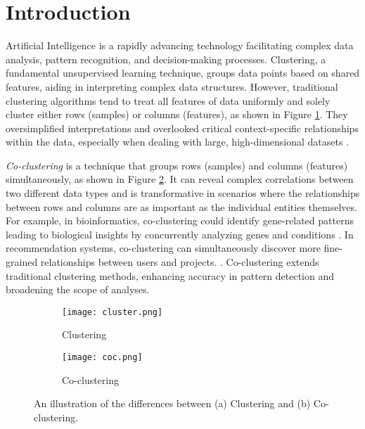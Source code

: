 

\section{Introduction}
Artificial Intelligence is a rapidly advancing technology facilitating complex data analysis, pattern recognition, and decision-making processes. Clustering, a fundamental unsupervised learning technique, groups data points based on shared features, aiding in interpreting complex data structures. However, traditional clustering algorithms \cite{zhang2023AdaptiveGraphConvolution, yuan2023JointNetworkTopology, wu2023EffectiveClusteringStructured}  tend to treat all features of data uniformly and solely cluster either rows (samples) or columns (features),  as shown in Figure \ref{fig:cluster}. They oversimplified interpretations and overlooked critical context-specific relationships within the data, especially when dealing with large, high-dimensional datasets \cite{chen2023FastFlexibleBipartite, zhao2023MultiviewCoclusteringMultisimilarity, kumar2023CoclusteringBasedMethods}.

\textit{Co-clustering}\cite{cheng2000BiclusteringExpressionData, kluger2003SpectralBiclusteringMicroarray, yan2017CoclusteringMultidimensionalBig} is a technique that groups rows (samples) and columns (features) simultaneously, as shown in Figure \ref{fig:cocluster}. It can reveal complex correlations between two different data types and is transformative in scenarios where the relationships between rows and columns are as important as the individual entities themselves. For example, in bioinformatics, co-clustering could identify gene-related patterns leading to biological insights by concurrently analyzing genes and conditions \cite{higham2007SpectralClusteringIts, kluger2003SpectralBiclusteringMicroarray, madeira2004BiclusteringAlgorithmsBiological, zhao2012BiclusteringAnalysisPattern, golchev2015BiclusteringAnalysisGene}. In recommendation systems, co-clustering can simultaneously discover more fine-grained relationships between users and projects.
   \cite{ dhillon2007WeightedGraphCuts, chen2023ParallelNonNegativeMatrix, bouchareb2019ModelBasedCoclustering}. Co-clustering extends traditional clustering methods, enhancing accuracy in pattern detection and broadening the scope of analyses.

\begin{figure}[htbp]
    \centering
    \begin{subfigure}[b]{0.22\textwidth}
        \texttt{[image: cluster.png]}
        \caption{Clustering}
        \label{fig:cluster}
    \end{subfigure}
    \hfill  
    \begin{subfigure}[b]{0.22\textwidth}
        \texttt{[image: coc.png]}
        \caption{Co-clustering}
        \label{fig:cocluster}
    \end{subfigure}
    \caption{An illustration of the differences between (a) Clustering and (b) Co-clustering.}
    \label{fig:cocomparison}
\end{figure}

